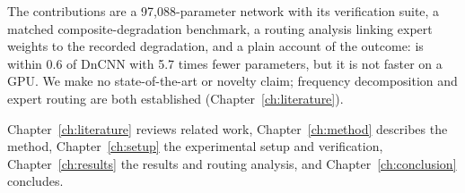 The contributions are a 97,088-parameter network with its verification
suite, a matched composite-degradation benchmark, a routing analysis linking
expert weights to the recorded degradation, and a plain account of the
outcome: \fcsg{} is within 0.6\dB{} of DnCNN with 5.7 times fewer parameters,
but it is not faster on a GPU. We make no state-of-the-art or novelty claim;
frequency decomposition and expert routing are both established
(Chapter~\ref{ch:literature}).

Chapter~\ref{ch:literature} reviews related work, Chapter~\ref{ch:method}
describes the method, Chapter~\ref{ch:setup} the experimental setup and
verification, Chapter~\ref{ch:results} the results and routing analysis, and
Chapter~\ref{ch:conclusion} concludes.
